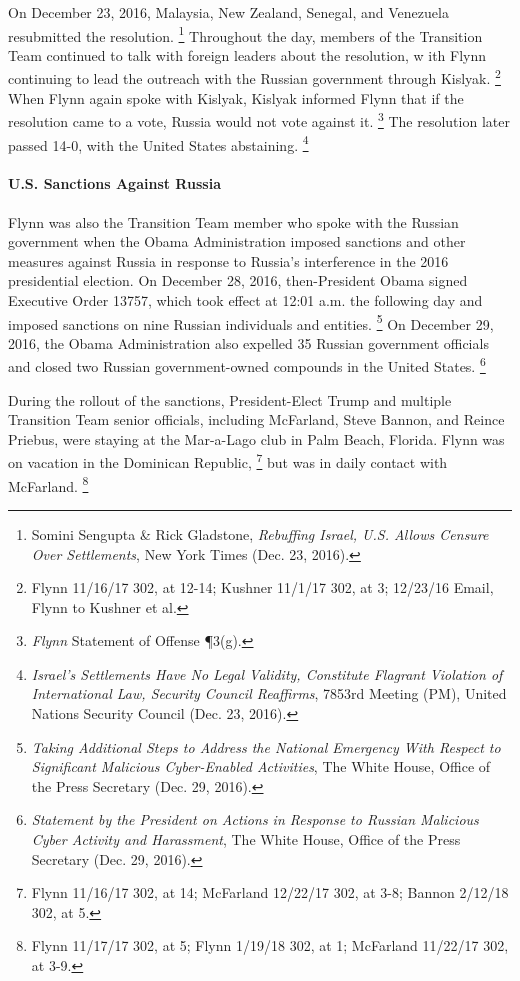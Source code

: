 On December 23, 2016, Malaysia, New Zealand, Senegal, and Venezuela resubmitted the resolution.%
\footnote{Somini Sengupta \& Rick Gladstone, \textit{Rebuffing Israel, U.S. Allows Censure Over Settlements}, New York Times (Dec. 23, 2016).}
Throughout the day, members of the Transition Team continued to talk with foreign leaders about the resolution, w ith Flynn continuing to lead the outreach with the Russian government through Kislyak.%
\footnote{Flynn 11/16/17 302, at 12-14;
Kushner 11/1/17 302, at 3;
12/23/16 Email, Flynn to Kushner et al.}
When Flynn again spoke with Kislyak, Kislyak informed Flynn that if the resolution came to a vote, Russia would not vote against it. %
\footnote{\textit{Flynn} Statement of Offense \P 3(g).}
The resolution later passed 14-0, with the United States abstaining.%
\footnote{\textit{Israel's Settlements Have No Legal Validity, Constitute Flagrant Violation of International Law, Security Council Reaffirms}, 7853rd Meeting (PM), United Nations Security Council (Dec. 23, 2016).}

\paragraph{U.S. Sanctions Against Russia}

Flynn was also the Transition Team member who spoke with the Russian government when the Obama Administration imposed sanctions and other measures against Russia in response to Russia's interference in the 2016 presidential election.
On December 28, 2016, then-President Obama signed Executive Order 13757, which took effect at 12:01 a.m. the following day and imposed sanctions on nine Russian individuals and entities.%
\footnote{\textit{Taking Additional Steps to Address the National Emergency With Respect to Significant Malicious Cyber-Enabled Activities}, The White House, Office of the Press Secretary (Dec. 29, 2016).}
On December 29, 2016, the Obama Administration also expelled 35 Russian government officials and closed two Russian government-owned compounds in the United States.%
\footnote{\textit{Statement by the President on Actions in Response to Russian Malicious Cyber Activity and Harassment}, The White House, Office of the Press Secretary (Dec. 29, 2016).}

During the rollout of the sanctions, President-Elect Trump and multiple Transition Team senior officials, including McFarland, Steve Bannon, and Reince Priebus, were staying at the Mar-a-Lago club in Palm Beach, Florida.
Flynn was on vacation in the Dominican Republic,%
\footnote{Flynn 11/16/17 302, at 14;
McFarland 12/22/17 302, at 3-8;
Bannon 2/12/18 302, at 5.}
but was in daily contact with McFarland.%
\footnote{Flynn 11/17/17 302, at 5;
Flynn 1/19/18 302, at 1;
McFarland 11/22/17 302, at 3-9.}

